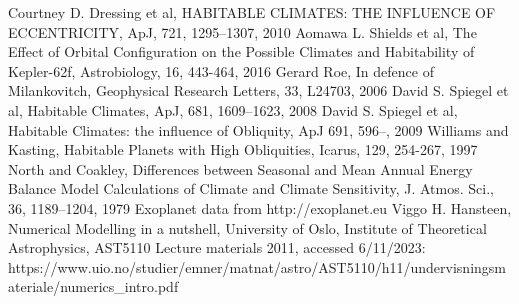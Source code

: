 \documentclass[12pt, onecolumn]{revtex4-2}    %
\begin{document}
\begin{thebibliography}{}
     Courtney D. Dressing et al, HABITABLE CLIMATES: THE INFLUENCE OF ECCENTRICITY, ApJ, 721, 1295--1307, 2010
     Aomawa L. Shields et al, The Effect of Orbital Configuration on the Possible Climates and Habitability of Kepler-62f, Astrobiology, 16, 443-464, 2016
     Gerard Roe, In defence of Milankovitch, Geophysical Research Letters, 33, L24703, 2006
     David S. Spiegel et al, Habitable Climates, ApJ, 681, 1609--1623, 2008
     David S. Spiegel et al, Habitable Climates: the influence of Obliquity, ApJ 691, 596--, 2009
     Williams and Kasting, Habitable Planets with High Obliquities, Icarus, 129, 254-267, 1997
     North and Coakley, Differences between Seasonal and Mean Annual Energy Balance Model Calculations of Climate and Climate Sensitivity, J. Atmos. Sci., 36, 1189--1204, 1979
     Exoplanet data from http://exoplanet.eu
     Viggo H. Hansteen, Numerical Modelling in a nutshell, University of Oslo, Institute of Theoretical Astrophysics, AST5110 Lecture materials 2011, accessed 6/11/2023: https://www.uio.no/studier/emner/matnat/astro/AST5110/h11/undervisningsmateriale/numerics\_intro.pdf
\end{thebibliography}
\end{document}
